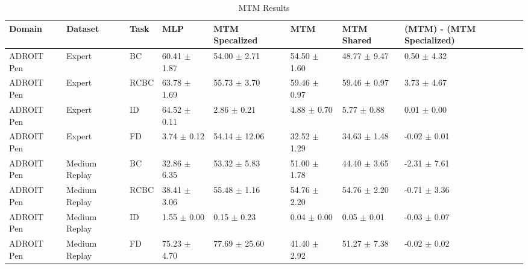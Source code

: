 \begin{table*}
  \caption{MTM Results}
  \label{tab:mtm}
  \centering
  \begin{tabular}{l l l l l l l l}
    \toprule
    Domain &       Dataset & Task &              MLP &    MTM Specalized &              MTM &       MTM Shared &                         (MTM) - (MTM Specialized) \\
    \midrule
ADROIT Pen &        Expert &   BC & 60.41 $\pm$ 1.87 &  54.00 $\pm$ 2.71 & 54.50 $\pm$ 1.60 & 48.77 $\pm$ 9.47 &  \textcolor[rgb]{0.00,0.50,0.00}{0.50 $\pm$ 4.32} \\
ADROIT Pen &        Expert & RCBC & 63.78 $\pm$ 1.69 &  55.73 $\pm$ 3.70 & 59.46 $\pm$ 0.97 & 59.46 $\pm$ 0.97 &     \textcolor[rgb]{0.0,1.0,0.0}{3.73 $\pm$ 4.67} \\
ADROIT Pen &        Expert &   ID & 64.52 $\pm$ 0.11 &   2.86 $\pm$ 0.21 &  4.88 $\pm$ 0.70 &  5.77 $\pm$ 0.88 &  \textcolor[rgb]{0.00,0.50,0.00}{0.01 $\pm$ 0.00} \\
ADROIT Pen &        Expert &   FD &  3.74 $\pm$ 0.12 & 54.14 $\pm$ 12.06 & 32.52 $\pm$ 1.29 & 34.63 $\pm$ 1.48 & \textcolor[rgb]{0.02,0.00,0.00}{-0.02 $\pm$ 0.01} \\
    \midrule
ADROIT Pen & Medium Replay &   BC & 32.86 $\pm$ 6.35 &  53.32 $\pm$ 5.83 & 51.00 $\pm$ 1.78 & 44.40 $\pm$ 3.65 & \textcolor[rgb]{1.00,0.00,0.00}{-2.31 $\pm$ 7.61} \\
ADROIT Pen & Medium Replay & RCBC & 38.41 $\pm$ 3.06 &  55.48 $\pm$ 1.16 & 54.76 $\pm$ 2.20 & 54.76 $\pm$ 2.20 & \textcolor[rgb]{0.71,0.00,0.00}{-0.71 $\pm$ 3.36} \\
ADROIT Pen & Medium Replay &   ID &  1.55 $\pm$ 0.00 &   0.15 $\pm$ 0.23 &  0.04 $\pm$ 0.00 &  0.05 $\pm$ 0.01 & \textcolor[rgb]{0.04,0.00,0.00}{-0.03 $\pm$ 0.07} \\
ADROIT Pen & Medium Replay &   FD & 75.23 $\pm$ 4.70 & 77.69 $\pm$ 25.60 & 41.40 $\pm$ 2.92 & 51.27 $\pm$ 7.38 & \textcolor[rgb]{0.03,0.00,0.00}{-0.02 $\pm$ 0.02} \\
    \midrule
    \bottomrule
  \end{tabular}
\end{table*}
